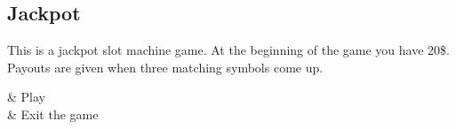 \subsection{Jackpot}
This is a jackpot slot machine game. At the beginning of the game you
have 20\$.  Payouts are given when three matching symbols come up.

\begin{btnmap}
    \PluginSelect
    & Play\\

    & Exit the game \\
\end{btnmap}
